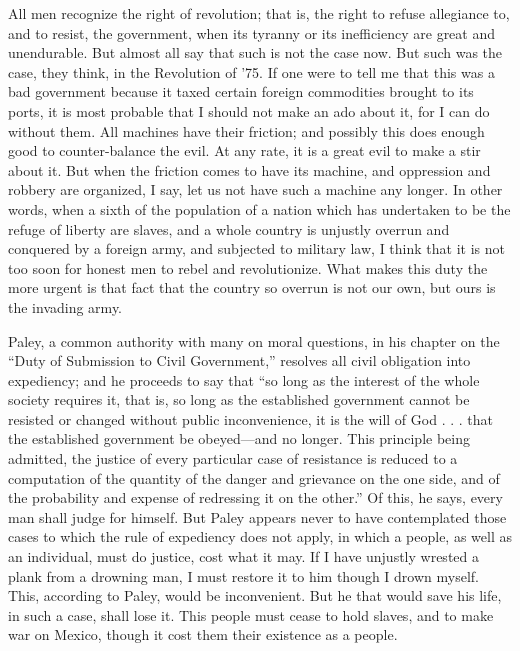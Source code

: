 \documentclass[12pt]{article}
\begin{document}
All men recognize the right of revolution; that is, the right to refuse
allegiance to, and to resist, the government, when its tyranny or its
inefficiency are great and unendurable. But almost all say that such is
not the case now. But such was the case, they think, in the Revolution
of '75. If one were to tell me that this was a bad government because it
taxed certain foreign commodities brought to its ports, it is most
probable that I should not make an ado about it, for I can do without
them. All machines have their friction; and possibly this does enough
good to counter-balance the evil. At any rate, it is a great evil to
make a stir about it. But when the friction comes to have its machine,
and oppression and robbery are organized, I say, let us not have such a
machine any longer. In other words, when a sixth of the population of a
nation which has undertaken to be the refuge of liberty are slaves, and
a whole country is unjustly overrun and conquered by a foreign army, and
subjected to military law, I think that it is not too soon for honest
men to rebel and revolutionize. What makes this duty the more urgent is
that fact that the country so overrun is not our own, but ours is the
invading army.

Paley, a common authority with many on moral questions, in his chapter
on the ``Duty of Submission to Civil Government,'' resolves all civil
obligation into expediency; and he proceeds to say that ``so long as the
interest of the whole society requires it, that is, so long as the
established government cannot be resisted or changed without public
inconvenience, it is the will of God . . . that the established
government be obeyed---and no longer. This principle being admitted, the
justice of every particular case of resistance is reduced to a
computation of the quantity of the danger and grievance on the one side,
and of the probability and expense of redressing it on the other.'' Of
this, he says, every man shall judge for himself. But Paley appears
never to have contemplated those cases to which the rule of expediency
does not apply, in which a people, as well as an individual, must do
justice, cost what it may. If I have unjustly wrested a plank from a
drowning man, I must restore it to him though I drown myself. This,
according to Paley, would be inconvenient. But he that would save his
life, in such a case, shall lose it. This people must cease to hold
slaves, and to make war on Mexico, though it cost them their existence
as a people.
\end{document}
